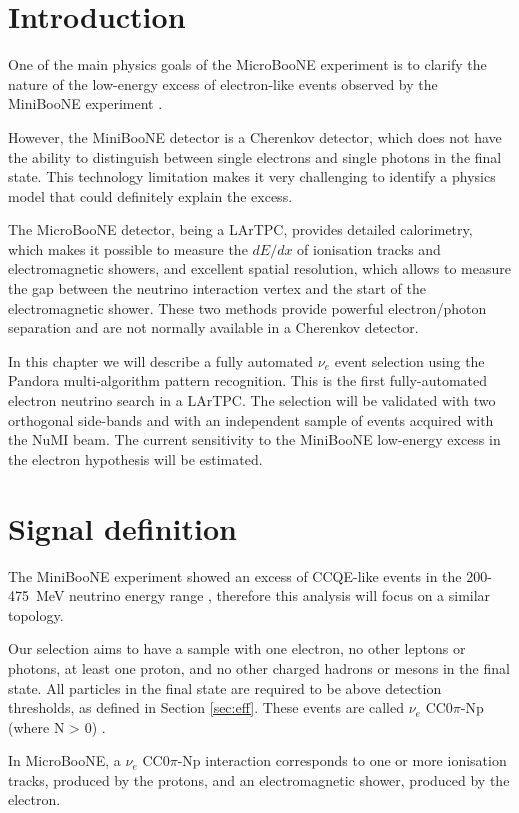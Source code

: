 \section{Introduction}
One of the main physics goals of the MicroBooNE experiment is to clarify the nature of the low-energy excess of electron-like events observed by the MiniBooNE experiment \cite{Aguilar-Arevalo:2018gpe}. 

However, the MiniBooNE detector is a Cherenkov detector, which does not have the ability to distinguish between single electrons and single photons in the final state. This technology limitation makes it very challenging to identify a physics model that could definitely explain the excess.

The MicroBooNE detector, being a LArTPC, provides detailed  calorimetry, which makes it possible to measure the $dE/dx$ of ionisation tracks and electromagnetic showers, and excellent spatial resolution, which allows to measure the gap between the neutrino interaction vertex and the start of the electromagnetic shower. These two methods provide powerful electron/photon separation and are not normally available in a Cherenkov detector. 

In this chapter we will describe a fully automated $\nu_{e}$ event selection using the Pandora multi-algorithm pattern recognition. This is the first fully-automated electron neutrino search in a LArTPC. The selection will be validated with two orthogonal side-bands and with an independent sample of events acquired with the NuMI beam. The current sensitivity to the MiniBooNE low-energy excess in the electron hypothesis will be estimated.

\section{Signal definition}
The MiniBooNE experiment showed an excess of CCQE-like events in the 200-475~MeV neutrino energy range \cite{Aguilar-Arevalo:2018gpe}, therefore this analysis will focus on a similar topology.

Our selection aims to have a sample with one electron, no other leptons or photons, at least one proton, and no other charged hadrons or mesons in the final state. All particles in the final state are required to be above detection thresholds, as defined in Section \ref{sec:eff}. These events are called $\nu_{e}$ CC0$\pi$-Np (where N > 0) \cite{Katori:2013nca}. 

In MicroBooNE, a $\nu_{e}$ CC0$\pi$-Np interaction corresponds to one or more ionisation tracks, produced by the protons, and an electromagnetic shower, produced by the electron. 

